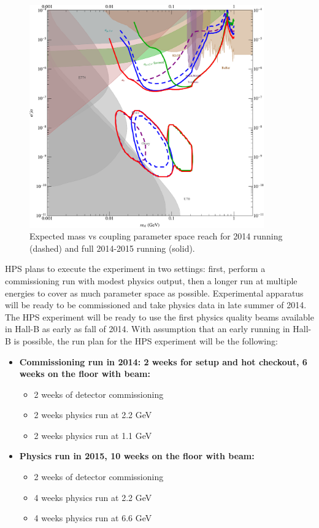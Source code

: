 \begin{figure}
\includegraphics[width=0.9\textwidth]{measurements/HPS-Proposal2014-Reach.pdf}
\caption{Expected mass vs coupling parameter space reach for 2014 running (dashed) and full 2014-2015 running (solid).}
\label{fig:reach}
\end{figure}

HPS plans to execute the experiment in two settings: first, perform a commissioning run with modest physics output, then a longer run at multiple energies to cover as much parameter space as possible. Experimental apparatus will be ready to be commissioned and take physics data in late summer of 2014. The HPS experiment will be ready to use the first physics quality beams available in Hall-B as early as fall of 2014. With assumption that an early running in Hall-B is possible, the run plan for the HPS experiment will be the following: 

\begin{itemize}
\item {\bf Commissioning run in 2014: 2 weeks for setup and hot checkout, 6 weeks on the floor with beam:}
\begin{itemize}
\item 2 weeks of detector commissioning
\item 2 weeks physics run at 2.2 GeV
\item 2 weeks physics run at 1.1 GeV
\end{itemize}
\item{\bf Physics run in 2015, 10 weeks on the floor with beam:}
\begin{itemize}
\item 2 weeks of detector commissioning
\item 4 weeks physics run at 2.2 GeV
\item 4 weeks physics run at 6.6 GeV
\end{itemize}
\end{itemize}

